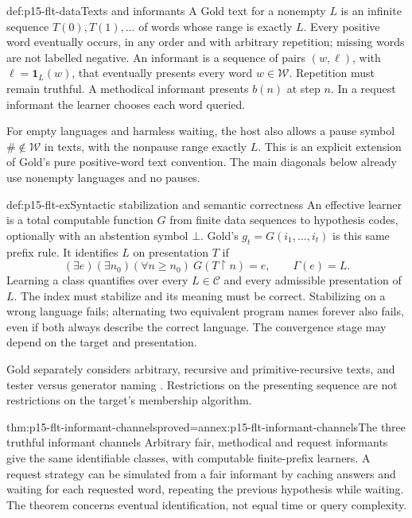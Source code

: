 \begin{hbdefinition}{def:p15-flt-data}{Texts and informants}
A Gold text for a nonempty \(L\) is an infinite sequence
\(T(0),T(1),\ldots\) of words whose range is exactly \(L\).
Every positive word eventually occurs, in any order and with
arbitrary repetition; missing words are not labelled negative.
An informant is a sequence of pairs \((w,\ell)\), with
\(\ell=\mathbf1_L(w)\), that eventually presents every
word \(w\in\mathcal W\). Repetition must remain truthful.
A methodical informant presents \(b(n)\) at step \(n\).
In a request informant the learner chooses each word queried.

For empty languages and harmless waiting, the host also allows
a pause symbol \(\#\notin\mathcal W\) in texts, with the
nonpause range exactly \(L\).
This is an explicit extension of Gold's pure positive-word
text convention. The main diagonals below already use
nonempty languages and no pauses.
\end{hbdefinition}

\begin{hbdefinition}{def:p15-flt-ex}{Syntactic stabilization and semantic correctness}
An effective learner is a total computable function \(G\)
from finite data sequences to hypothesis codes, optionally
with an abstention symbol \(\bot\).
Gold's \(g_t=G(i_1,\ldots,i_t)\) is this same prefix rule.
It identifies \(L\) on presentation \(T\) if
\[
 (\exists e)(\exists n_0)(\forall n\geq n_0)\
 G(T{\upharpoonright}n)=e,\qquad \Gamma(e)=L.
\]
Learning a class quantifies over every \(L\in\mathcal C\)
and every admissible presentation of \(L\).
The index must stabilize and its meaning must be correct.
Stabilizing on a wrong language fails; alternating two
equivalent program names forever also fails, even if both
always describe the correct language.
The convergence stage may depend on the target and presentation.
\end{hbdefinition}

Gold separately considers arbitrary, recursive and primitive-recursive
texts, and tester versus generator naming
\cite[pp.\ 449--452]{Gold1967IdentificationFLT}.
Restrictions on the presenting sequence are not restrictions
on the target's membership algorithm.

\begin{hbtheorem}{thm:p15-flt-informant-channels}{proved=annex:p15-flt-informant-channels}{The three truthful informant channels}
Arbitrary fair, methodical and request informants give the same
identifiable classes, with computable finite-prefix learners.
A request strategy can be simulated from a fair informant by
caching answers and waiting for each requested word, repeating
the previous hypothesis while waiting.
The theorem concerns eventual identification, not equal time
or query complexity.
\end{hbtheorem}

